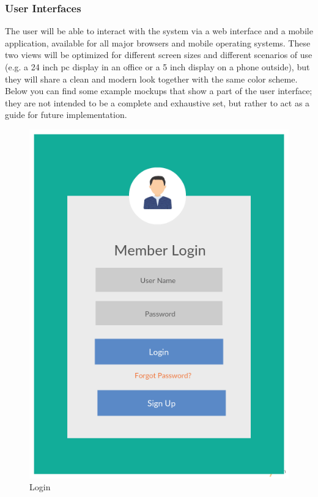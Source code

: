 \subsubsection{User Interfaces}

The user will be able to interact with the system via a web interface and a mobile application, available for all major browsers and mobile operating systems. These two views will be optimized for different screen sizes and different scenarios of use (e.g. a 24 inch pc display in an office or a 5 inch display on a phone outside), but they will share a clean and modern look together with the same color scheme.
\\ [0.2 cm]
Below you can find some example mockups that show a part of the user interface; they are not intended to be a complete and exhaustive set, but rather to act as a guide for future implementation.
\\ [0.5 cm]

\begin{figure}[!h]
\centering\includegraphics[scale=0.3]{Images/Placeholder.png}{}
\caption{Login}
\end{figure}

